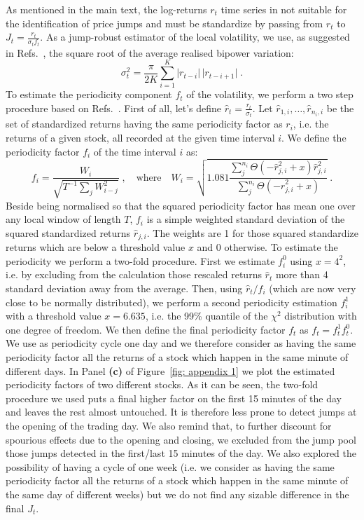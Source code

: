 \documentclass[amsmath,amssymb,aps,pre,floatfix,twocolumn,superscriptaddress]{revtex4}
\begin{document}
As mentioned in the main text, the log-returns $r_t$ time series in not suitable for the identification of price jumps and must be standardize by passing from $r_t$ to $J_t = \frac{r_t}{\sigma_t f_t}$. As a jump-robust estimator of the local volatility, we use, as suggested in Refs.~\cite{jump_test_1,jump_test_2}, the square root of the average realised bipower variation:
\[
\sigma^2_t = \frac{\pi}{2 K} \sum_{i=1}^{K} \vert r_{t-i} \vert\, \vert r_{t-i+1}\vert\; .
\]
To estimate the periodicity component $f_t$ of the volatility, we perform a two step procedure based on Refs.~\cite{jump_test_1,jump_test_2}. First of all, let's define $\hat{r}_t = \frac{r_t}{\sigma_t}$. Let $\hat{r}_{1,i}, \ldots , \hat{r}_{n_i,i}$ be the set of standardized returns having the same periodicity factor as $r_i$, i.e. the returns of a given stock, all recorded at the given time interval $i$. We define the periodicity factor $f_i$ of the time interval $i$ as:
\[
f_i = \frac{W_i}{ \sqrt{T^{-1} \sum_j W_{i-j}^2 }} \;, \quad \text{where} \quad W_i = \sqrt{1.081 \frac{\sum_j^{n_i} \Theta(-\hat{r}_{j,i}^2+x) \hat{r}_{j,i}^2}{\sum_j^{n_i} \Theta(-\hat{r}_{j,i}^2+x)}} \;.
\]
Beside being normalised so that the squared periodicity factor has mean one over any local window of length $T$, $f_i$ is a simple weighted standard deviation of the squared standardized returns $\hat{r}_{j,i}$. The weights are 1 for those squared standardize returns which are below a threshold value $x$ and 0 otherwise. To estimate the periodicity we perform a two-fold procedure. First we estimate $f^0_i$ using $x=4^2$, i.e. by excluding from the calculation those rescaled returns $\hat{r}_t$ more than 4 standard deviation away from the average. Then, using $\hat{r}_t/f_i$ (which are now very close to be normally distributed), we perform a second periodicity estimation $f^1_i$ with a threshold value $x=6.635$, i.e. the 99\% quantile of the $\chi^2$ distribution with one degree of freedom. We then define the final periodicity factor $f_t$ as $f_t = f^1_t f^0_t$. We use as periodicity cycle one day and we therefore consider as having the same periodicity factor all the returns of a stock which happen in the same minute of different days. In Panel \textbf{(c)} of Figure~\ref{fig: appendix 1} we plot the estimated periodicity factors of two different stocks. As it can be seen, the two-fold procedure we used puts a final higher factor on the first 15 minutes of the day and leaves the rest almost untouched. It is therefore less prone to detect jumps at the opening of the trading day. We also remind that, to further discount for spourious effects due to the opening and closing, we excluded from the jump pool those jumps detected in the first/last 15 minutes of the day. We also explored the possibility of having a cycle of one week (i.e. we consider as having the same periodicity factor all the returns of a stock which happen in the same minute of the same day of different weeks) but we do not find any sizable difference in the final $J_t$.
\end{document}
